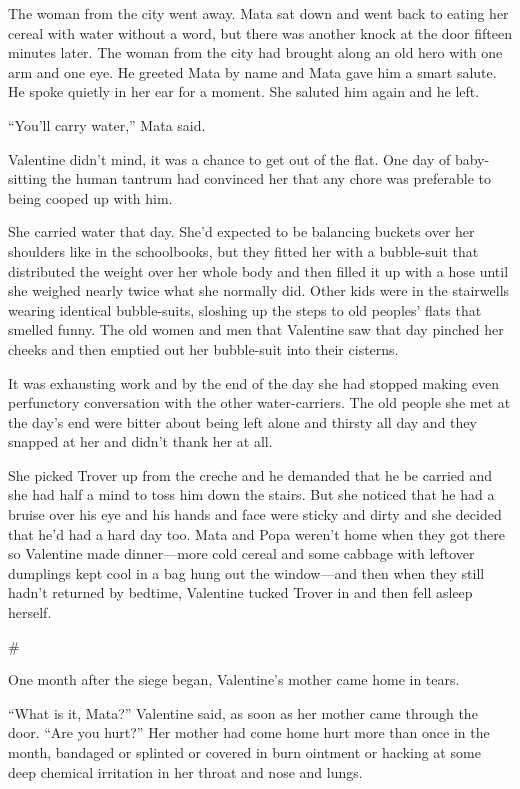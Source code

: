 The woman from the city went away. Mata sat down and went back to
eating her cereal with water without a word, but there was another
knock at the door fifteen minutes later. The woman from the city
had brought along an old hero with one arm and one eye. He greeted
Mata by name and Mata gave him a smart salute. He spoke quietly in
her ear for a moment. She saluted him again and he left.

“You’ll carry water,” Mata said.

Valentine didn’t mind, it was a chance to get out of the flat. One
day of baby-sitting the human tantrum had convinced her that any
chore was preferable to being cooped up with him.

She carried water that day. She’d expected to be balancing buckets
over her shoulders like in the schoolbooks, but they fitted her
with a bubble-suit that distributed the weight over her whole body
and then filled it up with a hose until she weighed nearly twice
what she normally did. Other kids were in the stairwells wearing
identical bubble-suits, sloshing up the steps to old peoples’ flats
that smelled funny. The old women and men that Valentine saw that
day pinched her cheeks and then emptied out her bubble-suit into
their cisterns.

It was exhausting work and by the end of the day she had stopped
making even perfunctory conversation with the other water-carriers.
The old people she met at the day’s end were bitter about being
left alone and thirsty all day and they snapped at her and didn’t
thank her at all.

She picked Trover up from the creche and he demanded that he be
carried and she had half a mind to toss him down the stairs. But
she noticed that he had a bruise over his eye and his hands and
face were sticky and dirty and she decided that he’d had a hard day
too. Mata and Popa weren’t home when they got there so Valentine
made dinner—more cold cereal and some cabbage with leftover
dumplings kept cool in a bag hung out the window—and then when they
still hadn’t returned by bedtime, Valentine tucked Trover in and
then fell asleep herself.

\#

One month after the siege began, Valentine’s mother came home in
tears.

“What is it, Mata?” Valentine said, as soon as her mother came
through the door. “Are you hurt?” Her mother had come home hurt
more than once in the month, bandaged or splinted or covered in
burn ointment or hacking at some deep chemical irritation in her
throat and nose and lungs.

